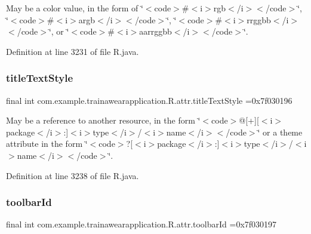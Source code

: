 May be a color value, in the form of \char`\"{}$<$code$>$\#$<$i$>$rgb$<$/i$>$$<$/code$>$\char`\"{}, \char`\"{}$<$code$>$\#$<$i$>$argb$<$/i$>$$<$/code$>$\char`\"{}, \char`\"{}$<$code$>$\#$<$i$>$rrggbb$<$/i$>$$<$/code$>$\char`\"{}, or \char`\"{}$<$code$>$\#$<$i$>$aarrggbb$<$/i$>$$<$/code$>$\char`\"{}. 

Definition at line 3231 of file R.\+java.

\mbox{\label{classcom_1_1example_1_1trainawearapplication_1_1_r_1_1attr_a60eaa58b691c978bc51934b3d8e97662}} 
\subsubsection{\texorpdfstring{titleTextStyle}{titleTextStyle}}
{\footnotesize\ttfamily final int com.\+example.\+trainawearapplication.\+R.\+attr.\+title\+Text\+Style =0x7f030196\hspace{0.3cm}{\ttfamily [static]}}

May be a reference to another resource, in the form \char`\"{}$<$code$>$@\mbox{[}+\mbox{]}\mbox{[}$<$i$>$package$<$/i$>$\+:\mbox{]}$<$i$>$type$<$/i$>$/$<$i$>$name$<$/i$>$$<$/code$>$\char`\"{} or a theme attribute in the form \char`\"{}$<$code$>$?\mbox{[}$<$i$>$package$<$/i$>$\+:\mbox{]}$<$i$>$type$<$/i$>$/$<$i$>$name$<$/i$>$$<$/code$>$\char`\"{}. 

Definition at line 3238 of file R.\+java.

\mbox{\label{classcom_1_1example_1_1trainawearapplication_1_1_r_1_1attr_aa3b30bdbaa8dc8cc6512a4edbf6bbce7}} 
\subsubsection{\texorpdfstring{toolbarId}{toolbarId}}
{\footnotesize\ttfamily final int com.\+example.\+trainawearapplication.\+R.\+attr.\+toolbar\+Id =0x7f030197\hspace{0.3cm}{\ttfamily [static]}}

